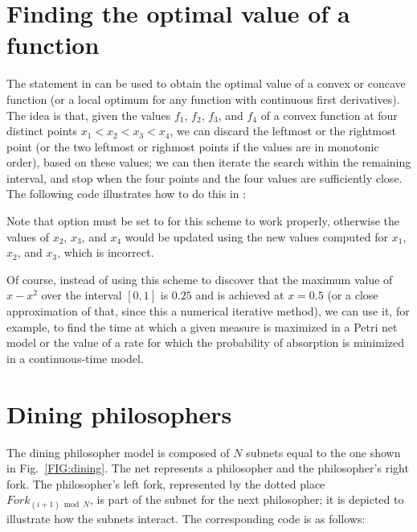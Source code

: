 \section{Finding the optimal value of a function}

The  statement in {\smart} can be used to obtain the optimal
value of a convex or concave function (or a local optimum for any function
with continuous first derivatives).
The idea is that, given the values $f_1$, $f_2$, $f_3$, and $f_4$
of a convex function at four distinct points $x_1 < x_2 < x_3 < x_4$,
we can discard the leftmost or the rightmost point (or the two leftmost
or righmost points if the values are in monotonic order), based on these values;
we can then iterate the search within the remaining interval,
and stop when the four points and the four values are sufficiently close.
The following code illustrates how to do this in {\smart}:
%

%
Note that option  must be set to  for this
scheme to work properly, otherwise the values of $x_2$, $x_3$, and $x_4$
would be updated using the new values computed for $x_1$, $x_2$, and $x_3$,
which is incorrect.

Of course, instead of using this scheme to discover that the maximum value
of $x-x^2$ over the interval $[0,1]$ is $0.25$ and is achieved at $x=0.5$
(or a close approximation of that, since this a numerical iterative method),
we can use it, for example, to find the time at which a given measure is
maximized in a Petri net model or the value of a rate for which the probability
of absorption is minimized in a continuous-time model.

\section{Dining philosophers}



The dining philosopher model \cite{Pastor1994} is composed of $N$ subnets equal
to the one shown in Fig.~\ref{FIG:dining}.
The net represents a philosopher and the philosopher's right fork.
The philosopher's left fork, represented by
the dotted place $\mathit{Fork}_{(i+1) \bmod N}$, is part of the
subnet for the next philosopher; it
is depicted to illustrate how the subnets interact.
The corresponding {\smart} code is as follows:
%

%

